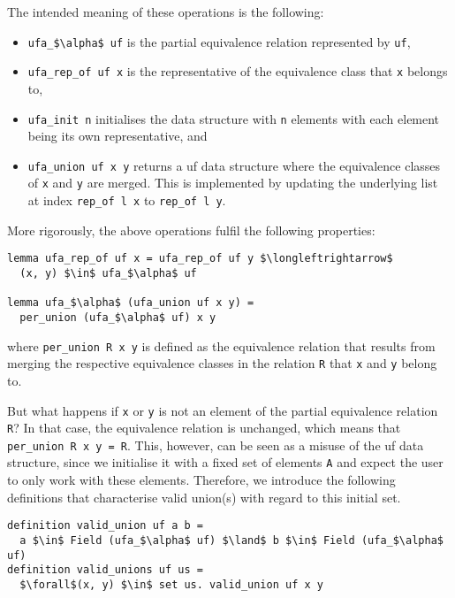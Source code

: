 \documentclass[
  sigplan,
  10pt,
  anonymous,
  review,
  ]{acmart}
\begin{document}
The intended meaning of these operations is the following:
\begin{itemize}
  \item \lstinline!ufa_$\alpha$ uf! is the partial equivalence relation represented by \lstinline!uf!,
  \item \lstinline!ufa_rep_of uf x! is the representative of the equivalence class that \lstinline!x! belongs to,
  \item \lstinline|ufa_init n| initialises the data structure with \lstinline|n| elements with each element being its own representative, and
  \item \lstinline!ufa_union uf x y! returns a \acrshort{uf} data structure where the equivalence classes of \lstinline!x! and \lstinline!y! are merged.
    This is implemented by updating the underlying list at index \lstinline!rep_of l x! to \lstinline|rep_of l y|.
\end{itemize}
More rigorously, the above operations fulfil the following properties:
\begin{lstlisting}
lemma ufa_rep_of uf x = ufa_rep_of uf y $\longleftrightarrow$
  (x, y) $\in$ ufa_$\alpha$ uf

lemma ufa_$\alpha$ (ufa_union uf x y) =
  per_union (ufa_$\alpha$ uf) x y
\end{lstlisting}
where \lstinline!per_union R x y! is defined as the equivalence relation that results from merging the respective equivalence classes in the relation \lstinline|R| that \lstinline!x! and \lstinline!y! belong to.

But what happens if \lstinline!x! or \lstinline!y! is not an element of the partial equivalence relation \lstinline|R|?
In that case, the equivalence relation is unchanged, which means that \lstinline|per_union R x y = R|.
This, however, can be seen as a misuse of the \acrshort{uf} data structure, since we initialise it with a fixed set of elements \lstinline|A| and expect the user to only work with these elements.
Therefore, we introduce the following definitions that characterise valid union(s) with regard to this initial set.
\begin{lstlisting}
definition valid_union uf a b =
  a $\in$ Field (ufa_$\alpha$ uf) $\land$ b $\in$ Field (ufa_$\alpha$ uf)
definition valid_unions uf us =
  $\forall$(x, y) $\in$ set us. valid_union uf x y
\end{lstlisting}
\end{document}
